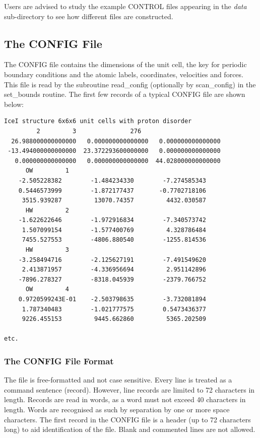 \noindent Users are advised to study the example CONTROL files
appearing in the {\em data} sub-directory to see how different
files are constructed.

\subsection{The CONFIG File}
\label{config-file}

The CONFIG file contains the dimensions of the unit cell, the key
for periodic boundary conditions and the atomic labels,
coordinates, velocities and forces.  This file is read by the
subroutine {\sc read\_config} (optionally by {\sc scan\_config})
in the {\sc set\_bounds} routine.  The first few records of a
typical CONFIG file are shown below:

\begin{verbatim}
IceI structure 6x6x6 unit cells with proton disorder
         2         3               276
  26.988000000000000   0.000000000000000   0.000000000000000
 -13.494000000000000  23.372293600000000   0.000000000000000
   0.000000000000000   0.000000000000000  44.028000000000000
      OW         1
    -2.505228382        -1.484234330        -7.274585343
    0.5446573999        -1.872177437       -0.7702718106
     3515.939287         13070.74357         4432.030587
      HW         2
    -1.622622646        -1.972916834        -7.340573742
     1.507099154        -1.577400769         4.328786484
     7455.527553        -4806.880540        -1255.814536
      HW         3
    -3.258494716        -2.125627191        -7.491549620
     2.413871957        -4.336956694         2.951142896
    -7896.278327        -8318.045939        -2379.766752
      OW         4
    0.9720599243E-01    -2.503798635        -3.732081894
     1.787340483        -1.021777575        0.5473436377
     9226.455153         9445.662860         5365.202509

etc.
\end{verbatim}

\subsubsection{The CONFIG File Format}

The file is free-formatted and not case sensitive.  Every line is
treated as a command sentence (record).  However, line records are
limited to 72 characters in length.  Records are read in words,
as a word must not exceed 40 characters in length.  Words are
recognised as such by separation by one or more space characters.
The first record in the CONFIG file is a header (up to 72
characters long) to aid identification of the file.  Blank and
commented lines are not allowed.

